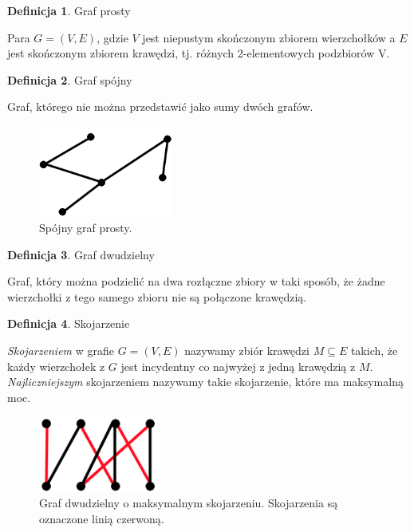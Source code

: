 \documentclass[brudnopis]{xmgr}
\theoremstyle{definition}
\newtheorem{Definicja}{Definicja}
\begin{document}
\begin{Definicja}{Graf prosty}

  Para $G = (V,E)$, gdzie $V$ jest niepustym skończonym zbiorem wierzchołków a $E$ jest skończonym zbiorem krawędzi, tj. różnych 2-elementowych podzbiorów V.
\end{Definicja}

\begin{Definicja}{Graf spójny}

  Graf, którego nie można przedstawić jako sumy dwóch grafów.
\end{Definicja}

\begin{figure}[ht!]
  \centering
  \includegraphics[height=3cm]{rysunki/spojny_graf_prosty.png}
    \caption{Spójny graf prosty.}
\end{figure} 

\begin{Definicja}{Graf dwudzielny}

	Graf, który można podzielić na dwa rozłączne zbiory w taki sposób, że żadne wierzchołki z tego samego zbioru nie są połączone krawędzią.
\end{Definicja}

\begin{Definicja}{Skojarzenie}

  \emph{Skojarzeniem} w grafie $G=(V,E)$ nazywamy zbiór krawędzi $M \subseteq E$ takich, że każdy wierzchołek z $G$ jest incydentny co najwyżej z jedną krawędzią z $M$. \emph{Najliczniejszym} skojarzeniem nazywamy takie skojarzenie, które ma maksymalną moc.   
\end{Definicja}

\begin{figure}[ht!]
  \centering
  \includegraphics[height=2.5cm]{rysunki/graf_dwudzielny_skojarzenie.png}
    \caption{Graf dwudzielny o maksymalnym skojarzeniu. Skojarzenia są oznaczone linią czerwoną.}
\end{figure} 
\end{document}
